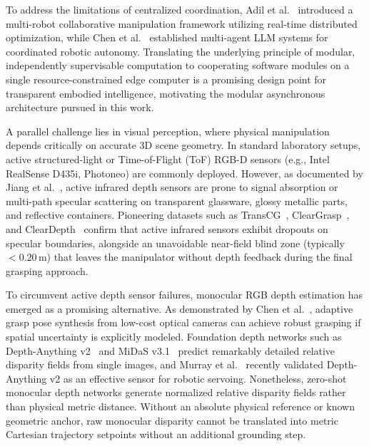 \documentclass[journal]{IEEEtran}
\begin{document}
To address the limitations of centralized coordination, Adil et al.~\cite{aria_008_muthusamy_2025_a} introduced a multi-robot collaborative manipulation framework utilizing real-time distributed optimization, while Chen et al.~\cite{aria_093_chen_2025_multiagent} established multi-agent LLM systems for coordinated robotic autonomy. Translating the underlying principle of modular, independently supervisable computation to cooperating software modules on a single resource-constrained edge computer is a promising design point for transparent embodied intelligence, motivating the modular asynchronous architecture pursued in this work.

A parallel challenge lies in visual perception, where physical manipulation depends critically on accurate 3D scene geometry. In standard laboratory setups, active structured-light or Time-of-Flight (ToF) RGB-D sensors (e.g., Intel RealSense D435i, Photoneo) are commonly deployed. However, as documented by Jiang et al.~\cite{aria_113_jiang_2023_robotic}, active infrared depth sensors are prone to signal absorption or multi-path specular scattering on transparent glassware, glossy metallic parts, and reflective containers. Pioneering datasets such as TransCG~\cite{aria_131_fang_2022_transcg}, ClearGrasp~\cite{aria_047_sajjan_2020_cleargrasp}, and ClearDepth~\cite{aria_046_team_2024_cleardepth} confirm that active infrared sensors exhibit dropouts on specular boundaries, alongside an unavoidable near-field blind zone (typically $<0.20$\,m) that leaves the manipulator without depth feedback during the final grasping approach.

To circumvent active depth sensor failures, monocular RGB depth estimation has emerged as a promising alternative. As demonstrated by Chen et al.~\cite{aria_116_authors_2025_adaptive}, adaptive grasp pose synthesis from low-cost optical cameras can achieve robust grasping if spatial uncertainty is explicitly modeled. Foundation depth networks such as Depth-Anything v2~\cite{aria_052_yang_2024_depth} and MiDaS v3.1~\cite{aria_089_birkl_2023_midas} predict remarkably detailed relative disparity fields from single images, and Murray et al.~\cite{aria_009_murray_2025_assessing} recently validated Depth-Anything v2 as an effective sensor for robotic servoing. Nonetheless, zero-shot monocular depth networks generate normalized relative disparity fields rather than physical metric distance. Without an absolute physical reference or known geometric anchor, raw monocular disparity cannot be translated into metric Cartesian trajectory setpoints without an additional grounding step.
\end{document}
